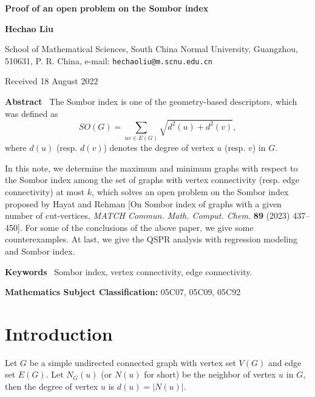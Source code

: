 \documentclass[a4paper,12pt]{article}
\begin{document}
\vspace*{10mm}

\noindent
{\Large \bf Proof of an open problem on the Sombor index}

\vspace{7mm}

\noindent
{\large \bf Hechao Liu}

\vspace{7mm}

\noindent
School of Mathematical Sciences, South China Normal University,  Guangzhou, 510631, P. R. China,
e-mail: {\tt hechaoliu@m.scnu.edu.cn} \\[2mm]

\vspace{7mm}

\noindent
Received 18 August 2022

\vspace{10mm}

\noindent
{\bf Abstract} \
The Sombor index is one of the geometry-based descriptors, which was defined as
$$SO(G)=\sum_{uv\in E(G)}\sqrt{d^{2}(u)+d^{2}(v)},$$
where $d(u)$ (resp. $d(v)$) denotes the degree of vertex $u$ (resp. $v$) in $G$.

In this note, we determine the maximum and minimum graphs with respect to the Sombor index among the set of graphs with vertex connectivity (resp. edge connectivity) at most $k$, which solves an open problem on the Sombor index proposed by Hayat and Rehman [On Sombor index of graphs with a given number of cut-vertices, {\it MATCH Commun. Math. Comput. Chem.\/} {\bf 89} (2023) 437--450]. For some of the conclusions of the above paper, we give some counterexamples.
At last, we give the QSPR analysis with regression modeling and Sombor index.

\vspace{5mm}

\noindent
{\bf Keywords} \ Sombor index, vertex connectivity, edge connectivity.

\noindent
\textbf{Mathematics Subject Classification:} 05C07, 05C09, 05C92

\baselineskip=0.30in


\section{Introduction}
\hskip 0.6cm
Let $G$ be a simple undirected connected graph with vertex set $V(G)$ and edge set $E(G)$.
Let $N_{G}(u)$ (or $N(u)$ for short) be the neighbor of vertex $u$ in $G$, then the degree of vertex $u$ is $d(u)=|N(u)|$.
\end{document}
